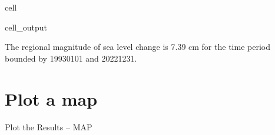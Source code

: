 \documentclass[letterpaper,10pt,english]{jupyterBook}
\begin{document}
\begin{sphinxuseclass}{cell}
\begin{sphinxVerbatimOutput}
\begin{sphinxuseclass}{cell_output}
\begin{sphinxVerbatim}[commandchars=\\\{\}]
The regional magnitude of sea level change is 7.39 cm for the time period bounded by 1993\PYGZhy{}01\PYGZhy{}01 and 2022\PYGZhy{}12\PYGZhy{}31.
\end{sphinxVerbatim}

\end{sphinxuseclass}\end{sphinxVerbatimOutput}

\end{sphinxuseclass}

\section{Plot a map}
\label{\detokenize{notebooks/regional_and_local/SL_Trend:plot-a-map}}
\sphinxAtStartPar
Plot the Results – MAP
\end{document}
